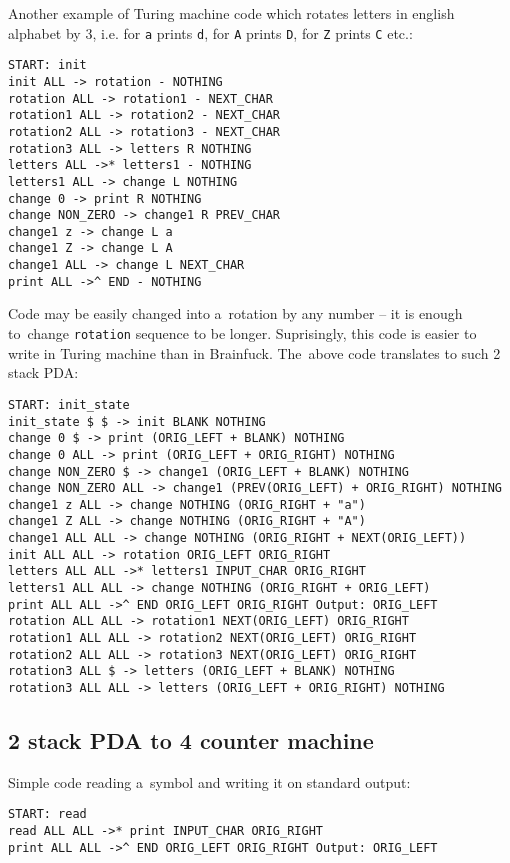 \documentclass[english,shortabstract,mgr]{iithesis}
\begin{document}
Another example of Turing machine code which rotates letters in english
alphabet by $3$, i.e. for \texttt{a} prints \texttt{d}, for \texttt{A}
prints \texttt{D}, for \texttt{Z} prints \texttt{C} etc.:

\begin{verbatim}
START: init
init ALL -> rotation - NOTHING
rotation ALL -> rotation1 - NEXT_CHAR
rotation1 ALL -> rotation2 - NEXT_CHAR
rotation2 ALL -> rotation3 - NEXT_CHAR
rotation3 ALL -> letters R NOTHING
letters ALL ->* letters1 - NOTHING
letters1 ALL -> change L NOTHING
change 0 -> print R NOTHING
change NON_ZERO -> change1 R PREV_CHAR
change1 z -> change L a
change1 Z -> change L A
change1 ALL -> change L NEXT_CHAR
print ALL ->^ END - NOTHING
\end{verbatim}

Code may be easily changed into a~rotation by any number -- it is enough
to~change \texttt{rotation} sequence to be longer. Suprisingly, this code
is easier to write in Turing machine than in Brainfuck. The~above code
translates to such 2 stack PDA:

\begin{verbatim}
START: init_state
init_state $ $ -> init BLANK NOTHING
change 0 $ -> print (ORIG_LEFT + BLANK) NOTHING
change 0 ALL -> print (ORIG_LEFT + ORIG_RIGHT) NOTHING
change NON_ZERO $ -> change1 (ORIG_LEFT + BLANK) NOTHING
change NON_ZERO ALL -> change1 (PREV(ORIG_LEFT) + ORIG_RIGHT) NOTHING
change1 z ALL -> change NOTHING (ORIG_RIGHT + "a")
change1 Z ALL -> change NOTHING (ORIG_RIGHT + "A")
change1 ALL ALL -> change NOTHING (ORIG_RIGHT + NEXT(ORIG_LEFT))
init ALL ALL -> rotation ORIG_LEFT ORIG_RIGHT
letters ALL ALL ->* letters1 INPUT_CHAR ORIG_RIGHT
letters1 ALL ALL -> change NOTHING (ORIG_RIGHT + ORIG_LEFT)
print ALL ALL ->^ END ORIG_LEFT ORIG_RIGHT Output: ORIG_LEFT
rotation ALL ALL -> rotation1 NEXT(ORIG_LEFT) ORIG_RIGHT
rotation1 ALL ALL -> rotation2 NEXT(ORIG_LEFT) ORIG_RIGHT
rotation2 ALL ALL -> rotation3 NEXT(ORIG_LEFT) ORIG_RIGHT
rotation3 ALL $ -> letters (ORIG_LEFT + BLANK) NOTHING
rotation3 ALL ALL -> letters (ORIG_LEFT + ORIG_RIGHT) NOTHING
\end{verbatim}

\subsection{2 stack PDA to 4 counter machine}

Simple code reading a~symbol and writing it on standard output:

\begin{verbatim}
START: read
read ALL ALL ->* print INPUT_CHAR ORIG_RIGHT
print ALL ALL ->^ END ORIG_LEFT ORIG_RIGHT Output: ORIG_LEFT
\end{verbatim}
\end{document}
